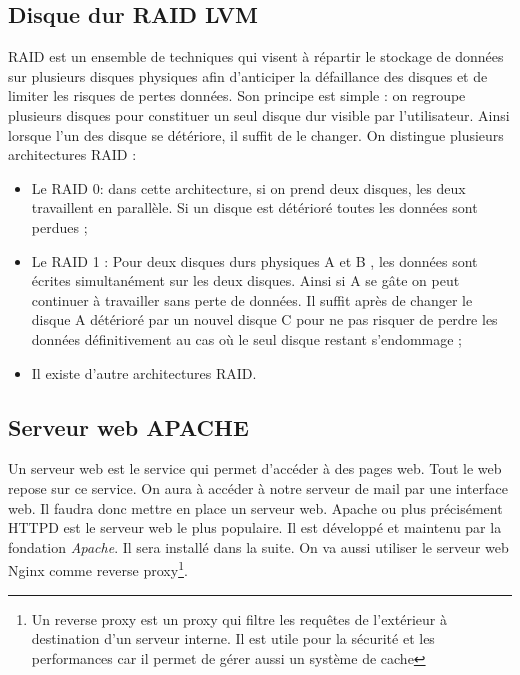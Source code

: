 \documentclass[a4paper,12pt,french]{report} %
\begin{document}
\subsection{Disque dur RAID LVM}
RAID est un ensemble de techniques qui visent à répartir le stockage de données sur plusieurs disques physiques afin d'anticiper la défaillance des disques et de limiter les risques de pertes données. Son principe est simple : on regroupe plusieurs disques pour constituer un seul disque dur visible par l'utilisateur. Ainsi lorsque l'un des disque se détériore, il suffit de le changer. On distingue plusieurs architectures RAID :
\begin{itemize}
	\item Le RAID 0: dans cette architecture, si on prend deux disques, les deux travaillent en parallèle. Si un disque est détérioré toutes les données sont perdues ;
	\item Le RAID 1 : Pour deux disques durs physiques A et B , les données sont écrites simultanément sur les deux disques. Ainsi si A se gâte on peut continuer à travailler sans perte de données. Il suffit après de changer le disque A détérioré par un nouvel disque C pour ne pas risquer de perdre les données définitivement au cas où le seul disque restant s'endommage ;
	\item Il existe d'autre architectures RAID.
\end{itemize}

\subsection{Serveur web APACHE}
Un serveur web est le service qui permet d'accéder à des pages web. Tout le web repose sur ce service. On aura à accéder à notre serveur de mail par une interface web. Il faudra donc mettre en place un serveur web. Apache ou plus précisément HTTPD est le serveur web le plus populaire. Il est développé et maintenu par la fondation \emph{Apache}. Il sera installé dans la suite. On va aussi utiliser le serveur web Nginx comme reverse proxy\footnote{Un reverse proxy est un proxy qui filtre les requêtes de l'extérieur à destination d'un serveur interne. Il est utile pour la sécurité et les performances car il permet de gérer aussi un système de cache}.
\end{document}
